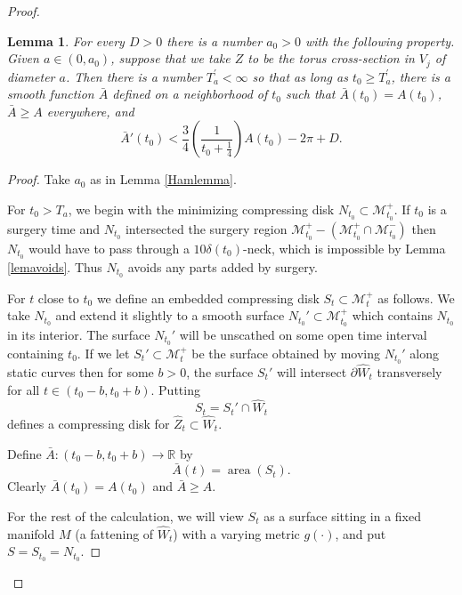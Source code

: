 \documentclass[12pt]{amsart}
\newcommand{\area}{\operatorname{area}}
\newcommand{\D}{\partial}
\newcommand{\M}{{\mathcal M}}
\newcommand{\R}{{\mathbb R}}
\newcommand{\ra}{\rightarrow}
\numberwithin{equation}{section}
\theoremstyle{plain}
\newtheorem{lemma}[equation]{Lemma}
\theoremstyle{definition}
\theoremstyle{remark}
\begin{document}
\begin{proof}
\begin{lemma} \label{lemsupport}
For every $D>0$ there is a number $a_0>0$ with the following property.
Given $a \in (0, a_0)$, suppose that we take $Z$ to be the torus
cross-section
in $V_j$
of diameter $a$. Then
there is a number $T^\prime_a < \infty$ so that as long as
$t_0\geq T^\prime_a$, there is a smooth function $\bar A$ defined
on a neighborhood of $t_0$ such that $\bar  A(t_0)=A(t_0)$, $\bar A\geq A$
everywhere, and 
\begin{equation} \label{dereqn}
\bar A'(t_0)< \frac{3}{4}\left(\frac{1}{t_0+\frac14}\right) A(t_0)-2\pi+D.
\end{equation}
\end{lemma}
\begin{proof}
Take $a_0$ as in Lemma \ref{Hamlemma}.

For $t_0 > T_a$,
we begin with the minimizing compressing disk $N_{t_0}\subset\M_{t_0}^+$.
If $t_0$ is a surgery time and $N_{t_0}$ intersected the surgery region $\M_{t_0}^+ -
(\M_{t_0}^+ \cap \M_{t_0}^-)$ then $N_{t_0}$ would have to pass through a
$10\delta(t_0)$-neck, which is impossible by Lemma \ref{lemavoids}.
Thus $N_{t_0}$ avoids any parts added by surgery.

For $t$ close to $t_0$ we define an embedded compressing disk $S_t\subset\M_t^+$
as follows. We take $N_{t_0}$ 
and extend it slightly to a smooth surface $N_{t_0}'\subset \M_{t_0}^+$ which contains 
$N_{t_0}$ in its interior.  The surface $N_{t_0}'$ will
be unscathed on some open time interval containing $t_0$. If we let
$S_t'\subset \M_t^+$ be the  surface obtained by moving $N_{t_0}'$ along
static curves then for some $b>0$, the surface $S_t'$ will
intersect $\D \hat W_t$ transversely for all $t\in (t_0-b,t_0+b)$.
Putting
\begin{equation}
S_t =  S_t'\cap \hat W_t 
\end{equation}
defines a compressing disk for $\hat Z_t\subset \hat W_t$.

Define $\bar A:(t_0-b,t_0+b)\ra \R$ by 
\begin{equation}
\bar A(t) =  \area(S_t).
\end{equation}
Clearly $\bar A(t_0)=A(t_0)$ and $\bar A\geq A$.

For the rest of the calculation, we will view $S_t$ as a surface sitting
in a fixed manifold $M$ (a fattening of $\hat W_t$)
 with a varying metric $g(\cdot)$, and
put $S =  S_{t_0}=N_{t_0}$.


\end{proof}
\end{proof}
\end{document}
